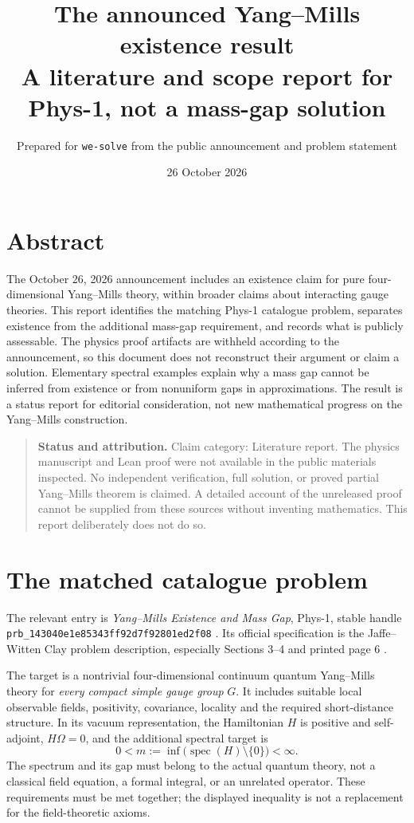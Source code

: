 \documentclass[11pt,a4paper]{article}
\title{The announced Yang--Mills existence result\\
\large A literature and scope report for Phys-1, not a mass-gap solution}
\author{Prepared for \texttt{we-solve} from the public announcement and problem statement}
\date{26 October 2026}
\numberwithin{equation}{section}
\theoremstyle{definition}
\theoremstyle{remark}
\newcommand{\spec}{\operatorname{spec}}
\newcommand{\statusbox}[1]{\begin{quote}\small\noindent\textbf{Status and attribution.} #1\end{quote}}
\begin{document}
\maketitle
\section*{Abstract}
The October 26, 2026 announcement includes an existence claim for pure
four-dimensional Yang--Mills theory, within broader claims about interacting
gauge theories. This report identifies the matching Phys-1 catalogue problem,
separates existence from the additional mass-gap requirement, and records what
is publicly assessable. The physics proof artifacts are withheld according to
the announcement, so this document does not reconstruct their argument or claim
a solution. Elementary spectral examples explain why a mass gap cannot be
inferred from existence or from nonuniform gaps in approximations. The result
is a status report for editorial consideration, not new mathematical progress
on the Yang--Mills construction.

\statusbox{Claim category: Literature report. The physics manuscript and Lean
proof were not available in the public materials inspected. No independent
verification, full solution, or proved partial Yang--Mills theorem is claimed.
A detailed account of the unreleased proof cannot be supplied from these
sources without inventing mathematics. This report deliberately does not do so.}

\section{The matched catalogue problem}
The relevant entry is \emph{Yang--Mills Existence and Mass Gap}, Phys-1,
stable handle
\texttt{prb\_143040e1e85343ff92d7f92801ed2f08}
\cite{catalogue}. Its official specification is the Jaffe--Witten Clay problem
description, especially Sections 3--4 and printed page 6 \cite{clay}.

The target is a nontrivial four-dimensional continuum quantum Yang--Mills
theory for \emph{every compact simple gauge group} $G$. It includes suitable
local observable fields, positivity, covariance, locality and the required
short-distance structure. In its vacuum representation, the Hamiltonian $H$
is positive and self-adjoint, $H\Omega=0$, and the additional spectral target is
\begin{equation}\label{eq:gap}
 0<m:=\inf\bigl(\spec(H)\setminus\{0\}\bigr)<\infty.
\end{equation}
The spectrum and its gap must belong to the actual quantum theory, not a
classical field equation, a formal integral, or an unrelated operator. These
requirements must be met together; the displayed inequality is not a replacement
for the field-theoretic axioms.
\end{document}
